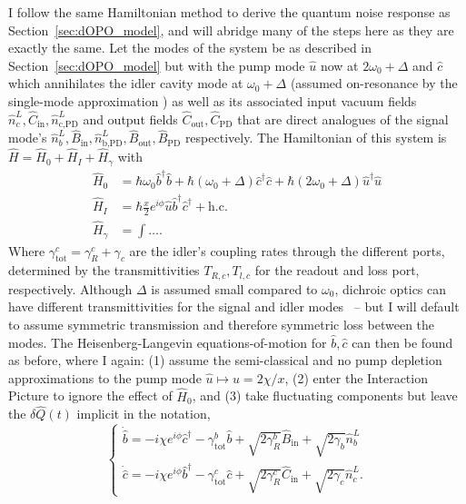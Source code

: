 I follow the same Hamiltonian method to derive the quantum noise response as Section~\ref{sec:dOPO_model}, and will abridge many of the steps here as they are exactly the same. Let the modes of the system be as described in Section~\ref{sec:dOPO_model} but with the pump mode $\hat u$ now at $2\omega_0+\Delta$ and $\hat c$ which annihilates the idler cavity mode at $\omega_0+\Delta$ (assumed on-resonance by the single-mode approximation ) as well as its associated input vacuum fields $\hat n^L_c, \hat C_\text{in}, \hat n^L_\text{c,PD}$ and output fields $\hat C_\text{out}, \hat C_\text{PD}$ that are direct analogues of the signal mode's $\hat n^L_b, \hat B_\text{in}, \hat n^L_\text{b,PD}, \hat B_\text{out}, \hat B_\text{PD}$ respectively. The Hamiltonian of this system is $\hat H = \hat H_0+\hat H_I+\hat H_\gamma$ with 
\begin{align}
\hat H_0 &= \hbar \omega_0 \hat b^\dag \hat b + \hbar (\omega_0+\Delta) \hat c^\dag \hat c + \hbar (2\omega_0+\Delta) \hat u^\dag \hat u\\
\hat H_I &= \hbar \frac{x}{2} e^{i\phi} \hat u \hat b^\dag \hat c^\dag + \text{h.c.}\\
\hat H_\gamma &= \int \ldots .
\end{align}
Where $\gamma^c_\text{tot}=\gamma^c_R+\gamma_c$ are the idler's coupling rates through the different ports, determined by the transmittivities $T_{R,c}, T_{l,c}$ for the readout and loss port, respectively. Although $\Delta$ is assumed small compared to $\omega_0$, dichroic optics can have different transmittivities for the signal and idler modes~\cite{} -- but I will default to assume symmetric transmission and therefore symmetric loss between the modes. The Heisenberg-Langevin equations-of-motion for $\hat b, \hat c$ can then be found as before, where I again: (1) assume the semi-classical and no pump depletion approximations to the pump mode $\hat u\mapsto u=2\chi/x$, (2) enter the Interaction Picture to ignore the effect of $\hat H_0$, and (3) take fluctuating components but leave the $\delta \hat Q(t)$ implicit in the notation,
\begin{equation}\begin{cases}
\dot{\hat{b}}=-i\chi e^{i\phi}\hat{c}^\dagger - \gamma^b_\mathrm{tot} \hat{b} + \sqrt{2\gamma^b_R}\hat{B}_\mathrm{in} + \sqrt{2\gamma_b}\hat{n}^L_b\\
\dot{\hat{c}}=-i\chi e^{i\phi}\hat{b}^\dagger - \gamma^c_\mathrm{tot} \hat{c} + \sqrt{2\gamma^c_R}\hat{C}_\mathrm{in} + \sqrt{2\gamma_c}\hat{n}^L_c.
\end{cases}\end{equation}
